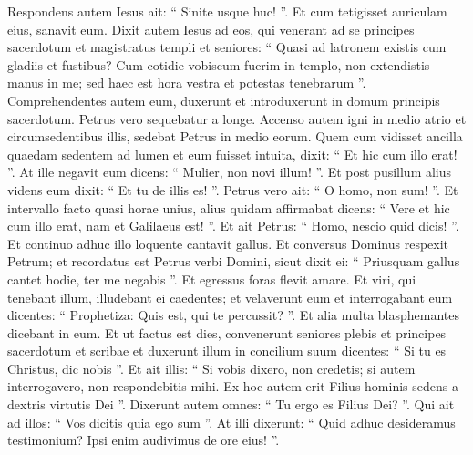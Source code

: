 \begin{biblechapter}
\begin{biblechapter}
\begin{biblechapter}
\begin{biblechapter}
\begin{biblechapter}
\begin{biblechapter}
\begin{biblechapter}
\begin{biblechapter}
\begin{biblechapter}
\begin{biblechapter}
\begin{biblechapter}
\begin{biblechapter}
\begin{biblechapter}
\begin{biblechapter}
\begin{biblechapter}
\begin{biblechapter}
\begin{biblechapter}
\begin{biblechapter}
\begin{biblechapter}
\begin{biblechapter}
\begin{biblechapter}
\begin{biblechapter}
\verse Respondens autem Iesus ait: “ Sinite usque huc! ”. Et cum tetigisset auriculam eius, sanavit eum. 
\verse Dixit autem Iesus ad eos, qui venerant ad se principes sacerdotum et magistratus templi et seniores: “ Quasi ad latronem existis cum gladiis et fustibus? 
\verse Cum cotidie vobiscum fuerim in templo, non extendistis manus in me; sed haec est hora vestra et potestas tenebrarum ”.
 \verse Comprehendentes autem eum, duxerunt et introduxerunt in domum principis sacerdotum. Petrus vero sequebatur a longe. 
\verse Accenso autem igni in medio atrio et circumsedentibus illis, sedebat Petrus in medio eorum. 
\verse Quem cum vidisset ancilla quaedam sedentem ad lumen et eum fuisset intuita, dixit: 
\verse “ Et hic cum illo erat! ”. At ille negavit eum dicens: 
\verse “ Mulier, non novi illum! ”. Et post pusillum alius videns eum dixit: “ Et tu de illis es! ”. Petrus vero ait: “ O homo, non sum! ”. 
\verse Et intervallo facto quasi horae unius, alius quidam affirmabat dicens: “ Vere et hic cum illo erat, nam et Galilaeus est! ”. 
\verse Et ait Petrus: “ Homo, nescio quid dicis! ”. Et continuo adhuc illo loquente cantavit gallus. 
\verse Et conversus Dominus respexit Petrum; et recordatus est Petrus verbi Domini, sicut dixit ei: “ Priusquam gallus cantet hodie, ter me negabis ”. 
\verse Et egressus foras flevit amare.
 \verse Et viri, qui tenebant illum, illudebant ei caedentes; 
\verse et velaverunt eum et interrogabant eum dicentes: “ Prophetiza: Quis est, qui te percussit? ”. 
 \verse Et alia multa blasphemantes dicebant in eum.
 \verse Et ut factus est dies, convenerunt seniores plebis et principes sacerdotum et scribae et duxerunt illum in concilium suum 
\verse dicentes: “ Si tu es Christus, dic nobis ”. Et ait illis: “ Si vobis dixero, non credetis; 
\verse si autem interrogavero, non respondebitis mihi.
 \verse Ex hoc autem erit Filius hominis sedens a dextris virtutis Dei ”. 
\verse Dixerunt autem omnes: “ Tu ergo es Filius Dei? ”. Qui ait ad illos: “ Vos dicitis quia ego sum ”. 
\verse At illi dixerunt: “ Quid adhuc desideramus testimonium? Ipsi enim audivimus de ore eius! ”.
 

\end{biblechapter}
\end{biblechapter}
\end{biblechapter}
\end{biblechapter}
\end{biblechapter}
\end{biblechapter}
\end{biblechapter}
\end{biblechapter}
\end{biblechapter}
\end{biblechapter}
\end{biblechapter}
\end{biblechapter}
\end{biblechapter}
\end{biblechapter}
\end{biblechapter}
\end{biblechapter}
\end{biblechapter}
\end{biblechapter}
\end{biblechapter}
\end{biblechapter}
\end{biblechapter}
\end{biblechapter}
